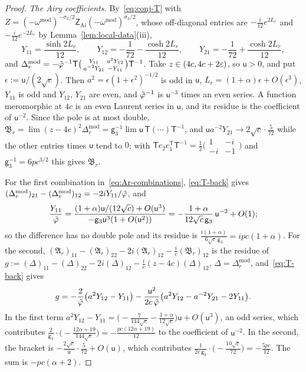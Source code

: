 \begin{proof}
\emph{The Airy coefficients.} By~\eqref{eq:conj-T} with $Z=(-\omega^{\mathrm{mod}})^{-\sigma_3/2}\mathsf Z_{\mathrm{Ai}}(-\omega^{\mathrm{mod}})^{\sigma_3/2}$,
whose off-diagonal entries are $-\frac i{12}e^{2L_r}$ and $-\frac i{12}e^{-2L_r}$ by Lemma~\ref{lem:local-data}(iii),
\begin{equation}\label{eq:Y-airy}
  Y_{11}=\frac{\sinh2L_r}{12},\qquad Y_{12}=-\frac1{72}-\frac{\cosh2L_r}{12},\qquad Y_{21}=-\frac1{72}+\frac{\cosh2L_r}{12},
\end{equation}
and $\Delta_r^{\mathrm{mod}}=-\tilde\varphi^{-1}\mathsf T\bigl(\begin{smallmatrix}Y_{11}&a^2Y_{12}\\a^{-2}Y_{21}&-Y_{11}\end{smallmatrix}\bigr)\mathsf T^{-1}$.
Take $z\in(4c,4c+2\varepsilon)$, so $\mathsf u>0$, and put $\epsilon:=\mathsf u/(2\sqrt c)$. Then $a^2=\epsilon(1+\epsilon^2)^{-1/2}$ is odd
in $\mathsf u$, $L_r=(1+\alpha)\epsilon+O(\epsilon^3)$, $Y_{11}$ is odd and $Y_{12}$, $Y_{21}$ are even, and $\tilde\varphi^{-1}$ is
$\mathsf u^{-3}$ times an even series. A function meromorphic at $4c$ is an even Laurent series in $\mathsf u$, and its residue
is the coefficient of $\mathsf u^{-2}$. Since the pole is at most double,
$\mathfrak B_r=\lim(z-4c)^2\Delta_r^{\mathrm{mod}}=\mathsf g_3^{-1}\lim\mathsf u\,\mathsf T(\cdots)\mathsf T^{-1}$, and
$\mathsf ua^{-2}Y_{21}\to2\sqrt c\cdot\frac5{72}$ while the other entries times $\mathsf u$ tend to $0$; with
$\mathsf Te_2e_1^{\mathsf T}\mathsf T^{-1}=\frac12\bigl(\begin{smallmatrix}1&-i\\-i&-1\end{smallmatrix}\bigr)$ and $\mathsf g_3^{-1}=6pc^{3/2}$ this
gives $\mathfrak B_r$.

For the first combination in~\eqref{eq:Ar-combinations}, \eqref{eq:T-back} gives
$(\Delta_r^{\mathrm{mod}})_{21}-(\Delta_r^{\mathrm{mod}})_{12}=-2iY_{11}/\tilde\varphi$, and
\[
  \frac{Y_{11}}{\tilde\varphi}=\frac{(1+\alpha)\mathsf u/(12\sqrt c)+O(\mathsf u^3)}{-\mathsf g_3\mathsf u^3(1+O(\mathsf u^2))}
  =-\frac{1+\alpha}{12\sqrt c\,\mathsf g_3}\,\mathsf u^{-2}+O(1);
\]
so the difference has no double pole and its residue is $\frac{i(1+\alpha)}{6\sqrt c\,\mathsf g_3}=ipc(1+\alpha)$. For the second,
$(\mathfrak A_r)_{11}-(\mathfrak A_r)_{22}-2i(\mathfrak A_r)_{12}-\frac ic(\mathfrak B_r)_{12}$ is the residue of
$g:=(\Delta)_{11}-(\Delta)_{22}-2i(\Delta)_{12}-\frac ic(z-4c)(\Delta)_{12}$, $\Delta=\Delta_r^{\mathrm{mod}}$, and~\eqref{eq:T-back} gives
\[
  g=-\frac2{\tilde\varphi}\bigl(a^2Y_{12}-Y_{11}\bigr)-\frac{\mathsf u^2}{2c\,\tilde\varphi}\bigl(a^2Y_{12}-a^{-2}Y_{21}-2Y_{11}\bigr).
\]
In the first term $a^2Y_{12}-Y_{11}=\bigl(-\frac7{144\sqrt c}-\frac{1+\alpha}{12\sqrt c}\bigr)\mathsf u+O(\mathsf u^3)$, an odd series,
which contributes $\frac2{\mathsf g_3}\cdot\bigl(-\frac{12\alpha+19}{144\sqrt c}\bigr)=-\frac{pc(12\alpha+19)}{12}$ to the coefficient of
$\mathsf u^{-2}$. In the second, the bracket is $-\frac{2\sqrt c}{\mathsf u}\cdot\frac5{72}+O(\mathsf u)$, which contributes
$\frac1{2c\,\mathsf g_3}\cdot\bigl(-\frac{10\sqrt c}{72}\bigr)=-\frac{5pc}{12}$. The sum is $-pc(\alpha+2)$.
\end{proof}


